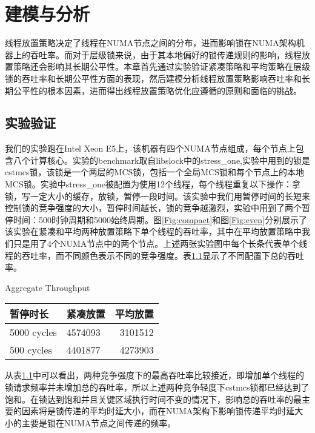 
\chapter{建模与分析}
\label{chap:example}
线程放置策略决定了线程在NUMA节点之间的分布，进而影响锁在NUMA架构机器上的吞吐率。而对于层级锁来说，由于其本地偏好的锁传递规则的影响，线程放置策略还会影响其长期公平性。本章首先通过实验验证紧凑策略和平均策略在层级锁的吞吐率和长期公平性方面的表现，然后建模分析线程放置策略影响吞吐率和长期公平性的根本因素，进而得出线程放置策略优化应遵循的原则和面临的挑战。
\section{实验验证}
我们的实验跑在Intel Xeon E5上，该机器有四个NUMA节点组成，每个节点上包含八个计算核心。实验的benchmark取自libslock中的stress\_one,实验中用到的锁是cstmcs锁，该锁是一个两层的MCS锁，包括一个全局MCS锁和每个节点上的本地MCS锁。实验中stress\_one被配置为使用12个线程，每个线程重复以下操作：拿锁，写一定大小的缓存，放锁，暂停一段时间。该实验中我们用暂停时间的长短来控制锁的竞争强度的大小，暂停时间越长，锁的竞争越激烈，实验中用到了两个暂停时间：500时钟周期和5000始终周期。图\ref{Fig:compact}和图\ref{Fig:even}分别展示了该实验在紧凑和平均两种放置策略下单个线程的吞吐率，其中在平均放置策略中我们只是用了4个NUMA节点中的两个节点。上述两张实验图中每个长条代表单个线程的吞吐率，而不同颜色表示不同的竞争强度。表\ref{tab:aggregate}显示了不同配置下总的吞吐率。

\begin{table}[!hpb]
  \centering
    {Aggregate Throughput}
  \label{tab:aggregate}
  \begin{tabular}{@{}llr@{}} \toprule
    暂停时长 & 紧凑放置 & 平均放置 \\ \midrule
    5000 cycles & 4574093 & 3101512 \\
    500  cycles & 4401877 & 4273903 \\
  \end{tabular}
\end{table}

从表\ref{tab:aggregate}中可以看出，两种竞争强度下的最高吞吐率比较接近，即增加单个线程的锁请求频率并未增加总的吞吐率，所以上述两种竞争轻度下cstmcs锁都已经达到了饱和。在锁达到饱和并且关键区域执行时间不变的情况下，影响总的吞吐率的最主要的因素将是锁传递的平均时延大小，而在NUMA架构下影响锁传递平均时延大小的主要是锁在NUMA节点之间传递的频率。

